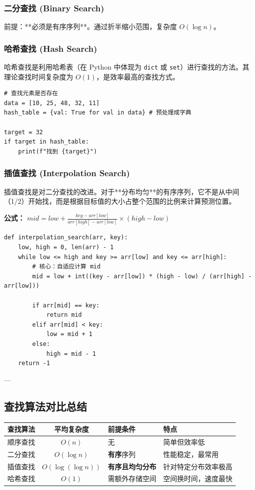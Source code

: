 \documentclass{article}
\begin{document}
\subsubsection{二分查找 (Binary Search)}
前提：**必须是有序序列**。通过折半缩小范围，复杂度 $O(\log n)$。

\subsubsection{哈希查找 (Hash Search)}
哈希查找是利用哈希表（在 Python 中体现为 \texttt{dict} 或 \texttt{set}）进行查找的方法。其理论查找时间复杂度为 $O(1)$，是效率最高的查找方式。

\begin{lstlisting}[caption=哈希查找示例]
# 查找元素是否存在
data = [10, 25, 48, 32, 11]
hash_table = {val: True for val in data} # 预处理成字典

target = 32
if target in hash_table:
    print(f"找到 {target}")
\end{lstlisting}

\subsubsection{插值查找 (Interpolation Search)}
插值查找是对二分查找的改进。对于**分布均匀**的有序序列，它不是从中间（1/2）开始找，而是根据目标值的大小占整个范围的比例来计算预测位置。

\textbf{公式：} 
$mid = low + \frac{key - arr[low]}{arr[high] - arr[low]} \times (high - low)$

\begin{lstlisting}[caption=插值查找核心逻辑]
def interpolation_search(arr, key):
    low, high = 0, len(arr) - 1
    while low <= high and key >= arr[low] and key <= arr[high]:
        # 核心：自适应计算 mid
        mid = low + int((key - arr[low]) * (high - low) / (arr[high] - arr[low]))
        
        if arr[mid] == key:
            return mid
        elif arr[mid] < key:
            low = mid + 1
        else:
            high = mid - 1
    return -1
\end{lstlisting}

---

\subsection{查找算法对比总结}

\begin{table}[h]
\centering
\begin{tabular}{|l|c|l|l|}
\hline
\textbf{查找算法} & \textbf{平均复杂度} & \textbf{前提条件} & \textbf{特点} \\ \hline
顺序查找 & $O(n)$ & 无 & 简单但效率低 \\ \hline
二分查找 & $O(\log n)$ & \textbf{有序}序列 & 性能稳定，最常用 \\ \hline
插值查找 & $O(\log(\log n))$ & \textbf{有序且均匀分布} & 针对特定分布效率极高 \\ \hline
哈希查找 & $O(1)$ & 需额外存储空间 & 空间换时间，速度最快 \\ \hline
\end{tabular}
\end{table}
\end{document}
